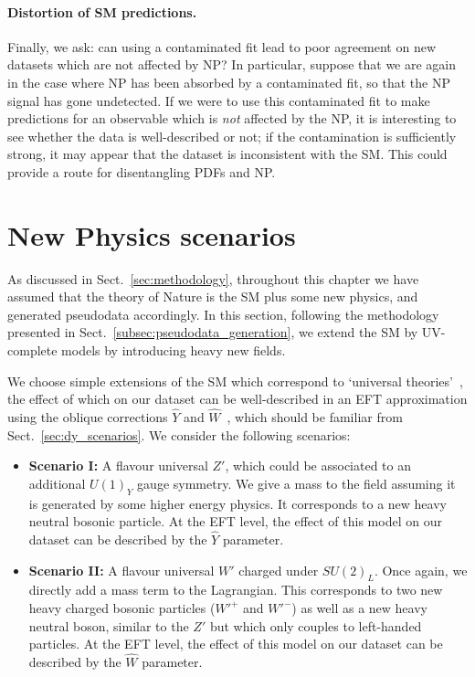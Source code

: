 \documentclass[withindex,glossary]{cam-thesis}
\begin{document}
\paragraph{Distortion of SM predictions.} Finally, we ask: can using a contaminated fit lead to poor agreement on new datasets which are not affected by NP? In particular, suppose that we are again in the case where NP has been absorbed by a contaminated fit, so that the NP signal has gone undetected. If we were to use this contaminated fit to make predictions for an observable which is \textit{not} affected by the NP, it is interesting to see whether the data is well-described or not; if the contamination is sufficiently strong, it may appear that the dataset is inconsistent with the SM. This could provide a route for disentangling PDFs and NP.



\section{New Physics scenarios}
\label{sec:scenarios}
As discussed in Sect.~\ref{sec:methodology}, throughout this chapter we have assumed that the theory of Nature is the SM plus some new physics, 
and generated pseudodata accordingly. 
In this section, following the methodology presented in Sect.~\ref{subsec:pseudodata_generation}, we
extend the SM by UV-complete models by introducing heavy new fields. 

We choose simple extensions of the SM which correspond to `universal theories'~\cite{Wells:2015uba},
the effect of which on our dataset can be well-described in an EFT approximation using the oblique corrections $\hat{Y}$ and $\hat{W}$~\cite{Peskin:1991sw,Altarelli:1991fk,Barbieri:2004qk}, which should be familiar from Sect.~\ref{sec:dy_scenarios}.
We consider the following scenarios:

\begin{itemize}
	\item {\bf Scenario I:} A flavour universal $Z'$, which could be associated to an additional $U(1)_Y$ gauge symmetry. We give a mass to the field assuming it is generated by some higher energy physics. It corresponds to a new heavy neutral bosonic particle. At the EFT level, the effect of this model on our dataset can be  
		described by the $\hat{Y}$ parameter.
	\item {\bf Scenario II:} A flavour universal $W'$ charged under $SU(2)_L$.
		Once again, we directly add a mass term to the Lagrangian. This corresponds to two new heavy charged bosonic particles ($W'^{+}$ and $W'^{-}$) as well as a new heavy neutral boson, similar to the $Z'$ but which only couples to left-handed particles. At the EFT level, the effect of this model on our dataset can 
	be described by the $\hat{W}$ parameter.
\end{itemize}
\end{document}
